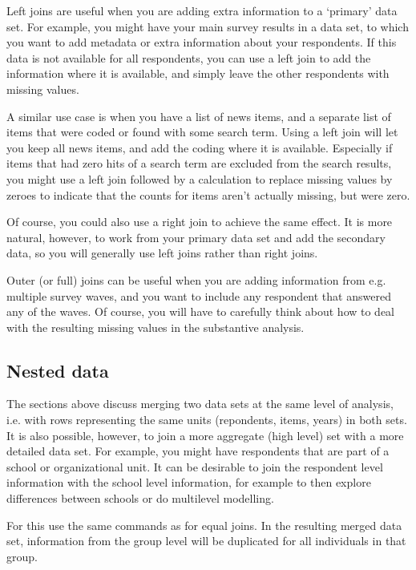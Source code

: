 Left joins are useful when you are adding extra information to a `primary' data set.
For example, you might have your main survey results in a data set,
to which you want to add metadata or extra information about your respondents.
If this data is not available for all respondents, you can use a left join to add the information
where it is available, and simply leave the other respondents with missing values.


A similar use case is when you have a list of news items, and a separate list of items that were coded
or found with some search term. Using a left join will let you keep all news items, and add the coding where it is available.
Especially if items that had zero hits of a search term are excluded from the search results,
you might use a left join followed by a calculation to replace missing values by zeroes to indicate that the counts for
items aren't actually missing, but were zero. 

Of course, you could also use a right join to achieve the same effect.
It is more natural, however, to work from your primary data set and add the secondary data,
so you will generally use left joins rather than right joins.

Outer (or full) joins can be useful when you are adding information from e.g. multiple survey waves,
and you want to include any respondent that answered any of the waves.
Of course, you will have to carefully think about how to deal with the resulting missing values in the substantive analysis. 

\subsection{Nested data}

The sections above discuss merging two data sets at the same level of analysis,
i.e. with rows representing the same units (repondents, items, years) in both sets.
It is also possible, however, to join a more aggregate (high level) set with a more detailed data set.
For example, you might have respondents that are part of a school or organizational unit.
It can be desirable to join the respondent level information with the school level information,
for example to then explore differences between schools or do multilevel modelling.

For this use the same commands as for equal joins.
In the resulting merged data set, information from the group level will be duplicated for all individuals in that group.

